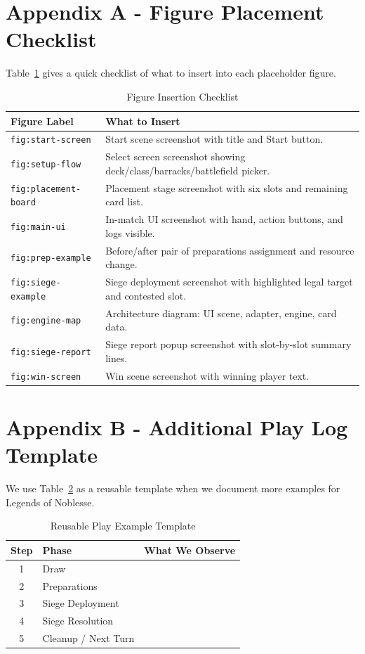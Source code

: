 \documentclass[12pt]{article}
\newcommand{\GameName}{Legends of Noblesse}
\begin{document}
\newpage
\appendix
\section{Appendix A - Figure Placement Checklist}
Table~\ref{tab:figure-checklist} gives a quick checklist of what to insert into each placeholder figure.

\begin{table}[H]
\centering
\caption{Figure Insertion Checklist}
\label{tab:figure-checklist}
\begin{tabular}{|p{3.2cm}|p{8.5cm}|}
\hline
\textbf{Figure Label} & \textbf{What to Insert} \\
\hline
\texttt{fig:start-screen} & Start scene screenshot with title and Start button. \\
\hline
\texttt{fig:setup-flow} & Select screen screenshot showing deck/class/barracks/battlefield picker. \\
\hline
\texttt{fig:placement-board} & Placement stage screenshot with six slots and remaining card list. \\
\hline
\texttt{fig:main-ui} & In-match UI screenshot with hand, action buttons, and logs visible. \\
\hline
\texttt{fig:prep-example} & Before/after pair of preparations assignment and resource change. \\
\hline
\texttt{fig:siege-example} & Siege deployment screenshot with highlighted legal target and contested slot. \\
\hline
\texttt{fig:engine-map} & Architecture diagram: UI scene, adapter, engine, card data. \\
\hline
\texttt{fig:siege-report} & Siege report popup screenshot with slot-by-slot summary lines. \\
\hline
\texttt{fig:win-screen} & Win scene screenshot with winning player text. \\
\hline
\end{tabular}
\end{table}

\section{Appendix B - Additional Play Log Template}
We use Table~\ref{tab:play-log-template} as a reusable template when we document more examples for \GameName.

\begin{table}[H]
\centering
\caption{Reusable Play Example Template}
\label{tab:play-log-template}
\begin{tabular}{|c|p{3.1cm}|p{7.2cm}|}
\hline
\textbf{Step} & \textbf{Phase} & \textbf{What We Observe} \\
\hline
1 & Draw &  \\
\hline
2 & Preparations &  \\
\hline
3 & Siege Deployment &  \\
\hline
4 & Siege Resolution &  \\
\hline
5 & Cleanup / Next Turn &  \\
\hline
\end{tabular}
\end{table}
\end{document}
